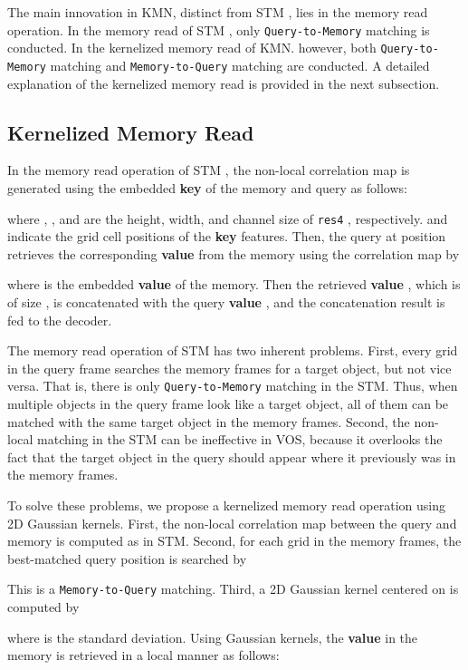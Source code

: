 \documentclass[runningheads]{llncs}
\begin{document}
The main innovation in KMN, distinct from STM \cite{Oh_2019_ICCV}, lies in the memory read operation. In the memory read of STM \cite{Oh_2019_ICCV}, only \texttt{Query-to-Memory} matching is conducted. In the kernelized memory read of KMN. however, both \texttt{Query-to-Memory} matching and \texttt{Memory-to-Query} matching are conducted. A detailed explanation of the kernelized memory read is provided in the next subsection.


\subsection{Kernelized Memory Read}
\label{s32}
In the memory read operation of STM \cite{Oh_2019_ICCV}, the non-local correlation map  is generated using the embedded \textbf{key} of the memory  and query  as follows:

where , , and  are the height, width, and channel size of \texttt{res4} \cite{b23}, respectively.  and  indicate the grid cell positions of the \textbf{key} features. Then, the query at position  retrieves the corresponding \textbf{value} from the memory using the correlation map by

where  is the embedded \textbf{value} of the memory. Then the retrieved \textbf{value} , which is of size , is concatenated with the query \textbf{value} , and the concatenation result is fed to the decoder.

The memory read operation of STM \cite{Oh_2019_ICCV} has two inherent problems. First, every grid in the query frame searches the memory frames for a target object, but not vice versa. That is, there is only \texttt{Query-to-Memory} matching in the STM. Thus, when multiple objects in the query frame look like a target object, all of them can be matched with the same target object in the memory frames. Second, the non-local matching in the STM can be ineffective in VOS, because it overlooks the fact that the target object in the query should appear where it previously was in the memory frames.

To solve these problems, we propose a kernelized memory read operation using 2D Gaussian kernels. First, the non-local correlation map  between the query and memory is computed as in STM. Second, for each grid  in the memory frames, the best-matched query position  is searched by

This is a \texttt{Memory-to-Query} matching. Third, a 2D Gaussian kernel  centered on  is computed by

where  is the standard deviation. Using Gaussian kernels, the \textbf{value} in the memory is retrieved in a local manner as follows:
\end{document}
